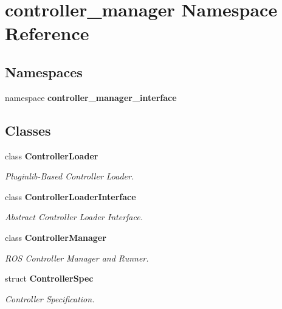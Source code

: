 \section{controller\-\_\-manager \-Namespace \-Reference}
\label{namespacecontroller__manager}
\subsection*{\-Namespaces}
\begin{DoxyCompactItemize}
\item 
namespace {\bf controller\-\_\-manager\-\_\-interface}
\end{DoxyCompactItemize}
\subsection*{\-Classes}
\begin{DoxyCompactItemize}
\item 
class {\bf \-Controller\-Loader}
\begin{DoxyCompactList}\small\item\em \-Pluginlib-\/\-Based \-Controller \-Loader. \end{DoxyCompactList}\item 
class {\bf \-Controller\-Loader\-Interface}
\begin{DoxyCompactList}\small\item\em \-Abstract \-Controller \-Loader \-Interface. \end{DoxyCompactList}\item 
class {\bf \-Controller\-Manager}
\begin{DoxyCompactList}\small\item\em \-R\-O\-S \-Controller \-Manager and \-Runner. \end{DoxyCompactList}\item 
struct {\bf \-Controller\-Spec}
\begin{DoxyCompactList}\small\item\em \-Controller \-Specification. \end{DoxyCompactList}\end{DoxyCompactItemize}
